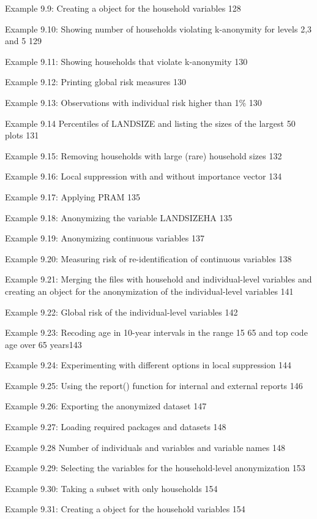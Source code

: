 \documentclass[letterpaper,10pt,english]{sphinxmanual}
\begin{document}
Example 9.9: Creating a  object for the household variables
128

Example 9.10: Showing number of households violating k-anonymity for
levels 2,3 and 5 129

Example 9.11: Showing households that violate k-anonymity 130

Example 9.12: Printing global risk measures 130

Example 9.13: Observations with individual risk higher than 1\% 130

Example 9.14 Percentiles of LANDSIZE and listing the sizes of the
largest 50 plots 131

Example 9.15: Removing households with large (rare) household sizes 132

Example 9.16: Local suppression with and without importance vector 134

Example 9.17: Applying PRAM 135

Example 9.18: Anonymizing the variable LANDSIZEHA 135

Example 9.19: Anonymizing continuous variables 137

Example 9.20: Measuring risk of re-identification of continuous
variables 138

Example 9.21: Merging the files with household and individual-level
variables and creating an  object for the anonymization of the
individual-level variables 141

Example 9.22: Global risk of the individual-level variables 142

Example 9.23: Recoding age in 10-year intervals in the range 15 \textendash{} 65 and
top code age over 65 years143

Example 9.24: Experimenting with different options in local suppression
144

Example 9.25: Using the report() function for internal and external
reports 146

Example 9.26: Exporting the anonymized dataset 147

Example 9.27: Loading required packages and datasets 148

Example 9.28 Number of individuals and variables and variable names 148

Example 9.29: Selecting the variables for the household-level
anonymization 153

Example 9.30: Taking a subset with only households 154

Example 9.31: Creating a  object for the household variables
154
\end{document}
